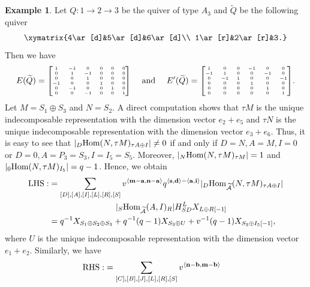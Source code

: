 \documentclass[reqno,12pt]{amsart}
\numberwithin{equation}{section}
\def\lr#1{\langle #1\rangle} \def\fin{\hfill$\square$}  \def\lra{\longrightarrow} \def\mod{\mbox{\rm \textbf{mod}}\,}\def\Mod{\mbox{\rm mod}\,}\def\top{\mbox{\rm top}\,}\def\soc{\mbox{\rm soc}\,}
\theoremstyle{plain} %
\theoremstyle{definition} %
\newtheorem{example}[theorem]{\bf Example}
\begin{document}
\begin{example}
    Let $Q:1\to2\to 3$ be the quiver of type $A_3$ and $\widetilde{Q}$ be the following quiver
    \[
    \xymatrix{4\ar[d]&5\ar[d]&6\ar[d]\\ 1\ar[r]&2\ar[r]&3.}
    \]
    Then we have
    $$E(\widetilde{Q})={\tiny\begin{bmatrix}
        1&-1&0&0&0&0\\
        0&1&-1&0&0&0\\
        0&0&1&0&0&0\\
        -1&0&0&1&0&0\\
        0&-1&0&0&1&0\\
        0&0&-1&0&0&1
    \end{bmatrix}}~~~~\text{and}~~~~E'(\widetilde{Q})={\tiny\begin{bmatrix}
        1&0&0&-1&0&0\\
        -1&1&0&0&-1&0\\
        0&-1&1&0&0&-1\\
        0&0&0&1&0&0\\
        0&0&0&0&1&0\\
        0&0&0&0&0&1
    \end{bmatrix}}.$$
    Let $M=S_1\oplus S_3$ and $N=S_2$. A direct computation shows that $\tau M$ is the unique indecomposable representation with the dimension vector $e_2+e_5$ and $\tau N$ is the unique indecomposable representation with the dimension vector $e_3+e_6$. Thus, it is easy to see that $|_D\mbox{\rm Hom}(N,\tau M)_{\tau A\oplus I}|\neq 0$ if and only if $D=N, A=M, I=0$ or $D=0,A=P_3=S_3,I=I_5=S_5$. Moreover, $|_N\mbox{\rm Hom}(N,\tau M)_{\tau M}|=1$ and $|_0\mbox{\rm Hom}(N,\tau M)_{I_5}|=q-1$. Hence, we obtain
    \begin{align*}
        {\rm LHS}:&=\sum\limits_{[D],[A],[I],[L],[R],[S]}v^{\lr{{\bf m}-{\bf a},{\bf n}-{\bf a}}}q^{\lr{{\bf s},{\bf d}}-\lr{{\bf a},{\bf i}}}|_D\Hom_{\widetilde{\A}}(N,\tau M)_{\tau A\oplus I}|\\&\quad\quad\quad\quad\quad\quad\quad\quad|{_S\Hom_{\widetilde{\A}}(A,I)_{R}}|H_{SD}^LX_{L\oplus R[-1]}\\
&=q^{-1}X_{S_1\oplus S_2\oplus S_3 }+q^{-1}(q-1)X_{S_3\oplus U}+v^{-1}(q-1)X_{S_3\oplus I_5[-1]},
    \end{align*}
    where $U$ is the unique indecomposable representation with the dimension vector $e_1+e_2$. Similarly, we have
    \begin{align*}
        {\rm RHS:}&=\sum\limits_{[C],[B],[J],[L],[R],[S]}v^{\lr{{\bf n}-{\bf b},{\bf m}-{\bf b}}}

\end{align*}
\end{example}
\end{document}
